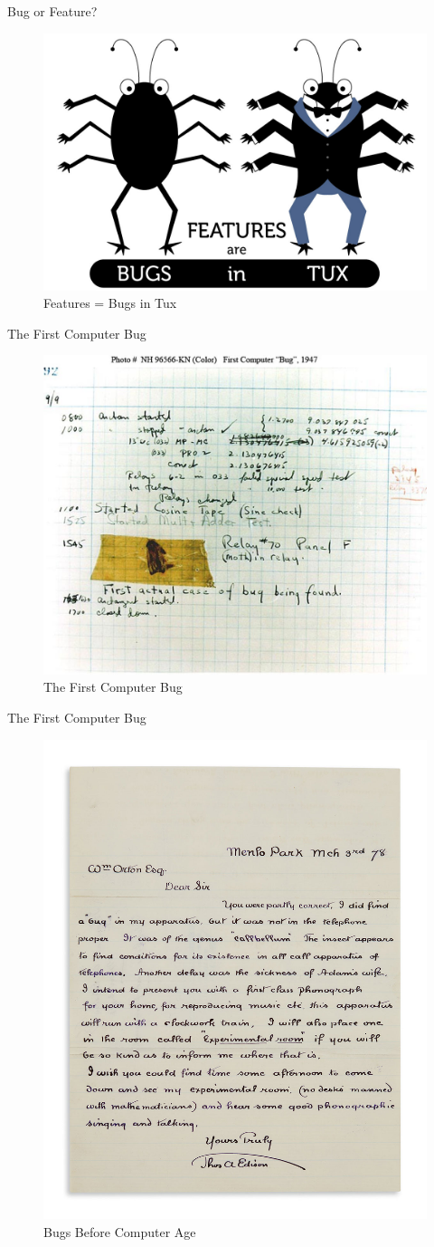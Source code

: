 \documentclass{beamer}
\begin{document}
\begin{frame}[t]{Bug or Feature?}
    \begin{figure}
        \includegraphics[width=.5\textwidth]{bugfeature.jpg}
        \caption{Features = Bugs in Tux}
    \end{figure}
\end{frame}
\begin{frame}[t]{The First Computer Bug}
    \begin{figure}
        \includegraphics[width=.5\textwidth]{computer-bug.jpg}  
        \caption{The First Computer Bug}
    \end{figure}
\end{frame}
\begin{frame}[t]{The First Computer Bug}
    \begin{figure}
        \includegraphics[width=.5\textwidth]{telebug.jpg}  
        \caption{Bugs Before Computer Age}
    \end{figure}
\end{frame}
\end{document}
